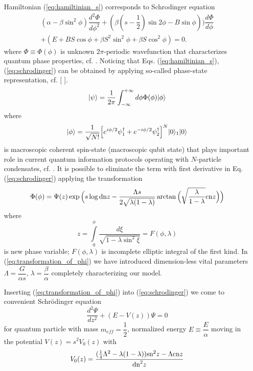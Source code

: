 \documentclass[aps, pre, preprint, groupedaddress, superscriptaddress, showkeys, showpacs] {revtex4-1}
\DeclarePairedDelimiter\ket{\lvert}{\rangle}
\begin{document}
Hamiltonian (\ref{eq:hamiltinian_s}) corresponds to Schrodinger equation
%
\begin{equation}
\begin{array}{l}
(\alpha - \beta \sin^2 \phi) \dfrac{d^2 \Phi}{d \phi^2} + (\beta(s - \dfrac{1}{2})\sin{2\phi}-B\sin{\phi})) \dfrac{d \Phi}{d \phi} \\
+ (E + BS \cos \phi + \beta S^2 \sin^2 \phi + \beta S \cos^2 \phi) = 0.
\end{array}
\label{eq:schrodinger}
\end{equation}
%
where $\Phi \equiv \Phi(\phi)$ is unknown $2\pi$-periodic wavefunction that characterizes quantum phase properties, cf. \cite{Anglin}.
Noticing that Eqs. (\ref{eq:hamiltinian_s}), (\ref{eq:schrodinger}) can be obtained by applying so-called phase-state representation, {\red cf. [  ]}.
%
\begin{equation}
\ket{\psi} = \dfrac{1}{2 \pi} \int_{-\infty}^{+\infty} d \phi \Phi(\phi) \ket{\phi}
\end{equation}
%
where
%
\begin{equation}
\ket{\phi} = \dfrac{1}{\sqrt{N!}} \Big[ e^{i\phi/2} \psi_1^\dagger + e^{-i \phi/2} \psi_2^\dag \Big]^N \ket{0}_1\ket{0}
\end{equation}
%
is macroscopic coherent spin-state (macroscopic qubit state) that plays important role in current quantum information protocols operating with $N$-particle condensates, cf. \cite{Byrnes_2012}.
It is possible to eliminate the term with first derivative in Eq.(\ref{eq:schrodinger}) applying the transformation
%
\begin{equation}
\Phi(\phi) = \Psi(z) \exp \Big( s \log \textrm{dn}{z} - \dfrac{\Lambda s}{2 \sqrt{\lambda (1 - \lambda)}} \arctan \Big( \sqrt{\dfrac{\lambda}{1 - \lambda}} \textrm{cn}{z} \Big) \Big)
\label{eq:transformation_of_phi}
\end{equation}
%
where
%
\begin{equation}
z = \int \limits_0^\phi \dfrac{d \xi}{\sqrt{1 - \lambda \sin^2 \xi}} = F(\phi, \lambda)
\end{equation}
is new phase variable; $F(\phi, \lambda)$ is incomplete elliptic integral of the first kind.
In (\ref{eq:transformation_of_phi}) we have introduced dimension-less vital parameters $\Lambda = \dfrac{G}{\alpha s}$, $\lambda = \dfrac{\beta}{\alpha}$ completely characterizing our model.

Inserting (\ref{eq:transformation_of_phi}) into (\ref{eq:schrodinger}) we come to convenient Schr\"odinger equation
%
\begin{equation}
\frac{d^2\Psi}{dz^2} + (E - V(z))\Psi = 0
\label{eq:schrodinger_usual}
\end{equation}
%
for quantum particle with mass $m_{eff} = \dfrac{1}{2}$, normalized energy $E \equiv \dfrac{E}{\alpha}$ moving in the potential $V(z) = s^2 V_0(z)$ with
%
\begin{equation}
V_0(z) = \frac{ (\frac{1}{4} \Lambda^2 - \lambda (1 - \lambda)) \textrm{sn}^2{z} - \Lambda \textrm{cn}{z}}{\textrm{dn}^2{z}}
\label{eq:potential}
\end{equation}
%
\end{document}
